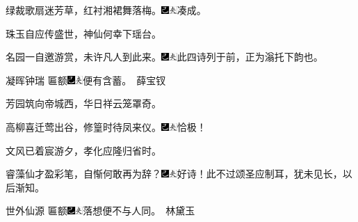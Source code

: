 绿裁歌扇迷芳草，红衬湘裙舞落梅。{\includegraphics[width=3mm]{../Images/00003}\includegraphics[width=3mm]{../Images/00012}\footnotesize \kaishu 凑成。}

珠玉自应传盛世，神仙何幸下瑶台。

名园一自邀游赏，未许凡人到此来。{{\includegraphics[width=3mm]{../Images/00003}\includegraphics[width=3mm]{../Images/00012}\footnotesize \kaishu 此四诗列于前，正为}滃{托下韵也。}}

凝晖钟瑞
{匾额{\includegraphics[width=3mm]{../Images/00003}\includegraphics[width=3mm]{../Images/00012}\footnotesize \kaishu 便有含蓄。}}　薛宝钗

芳园筑向帝城西，华日祥云笼罩奇。

高柳喜迁莺出谷，修篁时待凤来仪。{\includegraphics[width=3mm]{../Images/00003}\includegraphics[width=3mm]{../Images/00012}\footnotesize \kaishu 恰极！}

文风已着宸游夕，孝化应隆归省时。

睿藻仙才盈彩笔，自惭何敢再为辞？{\includegraphics[width=3mm]{../Images/00003}\includegraphics[width=3mm]{../Images/00012}\footnotesize \kaishu 好诗！此不过颂圣应制耳，犹未见长，以后渐知。}

世外仙源
{匾额{\includegraphics[width=3mm]{../Images/00003}\includegraphics[width=3mm]{../Images/00012}\footnotesize \kaishu 落想便不与人同。}}　林黛玉

